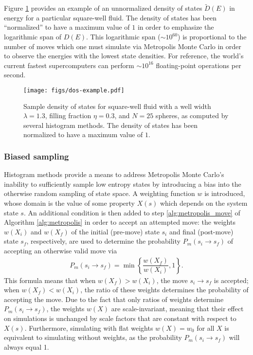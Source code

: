 \documentclass[11pt]{article}
\newcommand{\f}[2]{\dfrac{#1}{#2}} %
\newcommand{\p}[1]{\left(#1\right)} %
\renewcommand{\set}[1]{\left\{#1\right\}} %
\begin{document}
Figure \ref{fig:dos_sample} provides an example of an unnormalized
density of states $\tilde D\p{E}$ in energy for a particular
square-well fluid. The density of states has been ``normalized'' to
have a maximum value of $1$ in order to emphasize the logarithmic span
of $D\p{E}$. This logarithmic span ($\sim10^{60}$) is proportional to
the number of moves which one must simulate via Metropolis Monte Carlo
in order to observe the energies with the lowest state densities. For
reference, the world's current fastest supercomputers can perform
$\sim10^{16}$ floating-point operations per second.

\begin{figure}
  \centering
  \texttt{[image: figs/dos-example.pdf]}
  \caption[Density of states]
  {Sample density of states for square-well fluid with a well width
    $\lambda=1.3$, filling fraction $\eta=0.3$, and $N=25$ spheres, as
    computed by several histogram methods. The density of states has
    been normalized to have a maximum value of $1$.}
  \label{fig:dos_sample}
\end{figure}

\subsubsection{Biased sampling}
\label{sec:biased_sampling}

Histogram methods provide a means to address Metropolis Monte Carlo's
inability to sufficiently sample low entropy states by introducing a
bias into the otherwise random sampling of state space. A weighting
function $w$ is introduced, whose domain is the value of some property
$X\p{s}$ which depends on the system state $s$. An additional
condition is then added to step \ref{alg:metropolis_move} of Algorithm
\ref{alg:metropolis} in order to accept an attempted move: the weights
$w\p{X_i}$ and $w\p{X_f}$ of the initial (pre-move) state $s_i$ and
final (post-move) state $s_f$, respectively, are used to determine the
probability $P_m\p{s_i\to s_f}$ of accepting an otherwise valid move
via
\begin{align}
  P_m\p{s_i\to s_f}=\min\set{\f{w\p{X_f}}{w\p{X_i}},1}.
  \label{eq:move_prob}
\end{align}
This formula means that when $w\p{X_f}>w\p{X_i}$, the move $s_i\to
s_f$ is accepted; when $w\p{X_f}<w\p{X_i}$, the ratio of these weights
determines the probability of accepting the move. Due to the fact that
only ratios of weights determine $P_m\p{s_i\to s_f}$, the weights
$w\p{X}$ are scale-invariant, meaning that their effect on simulations
is unchanged by scale factors that are constant with respect to
$X\p{s}$. Furthermore, simulating with flat weights $w\p{X}=w_0$ for
all $X$ is equivalent to simulating without weights, as the
probability $P_m\p{s_i\to s_f}$ will always equal 1.
\end{document}
